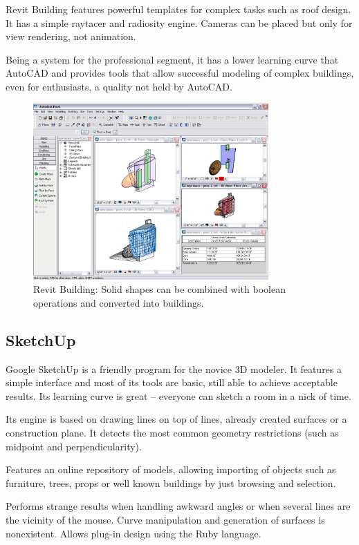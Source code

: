 Revit Building features powerful templates for complex tasks such as roof design.
It has a simple raytacer and radiosity engine.
Cameras can be placed but only for view rendering, not animation.

Being a system for the professional segment, it has a lower learning curve that
AutoCAD and provides tools that allow successful modeling of complex buildings,
even for enthusiasts, a quality not held by AutoCAD.

\begin{figure}[!ht]
    \centering
    \includegraphics[width=9cm]{gfx/revit-1.png}
    \caption{Revit Building: Solid shapes can be combined with boolean operations and converted into buildings.}
    \label{FIG-REVIT}
\end{figure}

\subsection{SketchUp}
Google SketchUp \cite{SITE-SKETCHUP} is a friendly program for the novice 3D modeler.
It features a simple interface and most of its tools are basic,
still able to achieve acceptable results.
Its learning curve is great -- everyone can sketch a room in a nick of time.

Its engine is based on drawing lines on top of lines,
already created surfaces or a construction plane.
It detects the most common geometry restrictions (such as midpoint and perpendicularity).

Features an online repository of models, allowing importing of objects such as
furniture, trees, props or well known buildings by just browsing and selection.

Performs strange results when handling awkward angles or when several lines
are the vicinity of the mouse.
Curve manipulation and generation of surfaces is nonexistent.
Allows plug-in design using the Ruby language.

